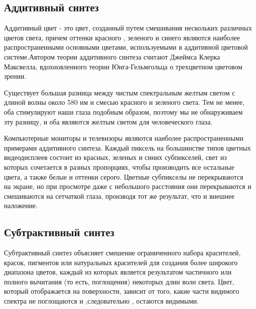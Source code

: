 \subsection{Аддитивный синтез}
Аддитивный цвет - это цвет, созданный путем смешивания нескольких различных цветов света, причем оттенки красного , зеленого и синего являются наиболее распространенными основными цветами, используемыми в аддитивной цветовой системе.Автором теории аддитивного синтеза считают Джеймса Клерка Максвелла, вдохновленного теории Юнга-Гельмгольца о трехцветном цветовом зрении.

\begin{figure}[ht!]
\end{figure}

Существует большая разница между чистым спектральным желтым светом с длиной волны около 580 нм и смесью красного и зеленого света. Тем не менее, оба стимулируют наши глаза подобным образом, поэтому мы не обнаруживаем эту разницу, и оба являются желтым светом для человеческого глаза. 


Компьютерные мониторы и телевизоры являются наиболее распространенными примерами аддитивного синтеза. Каждый пиксель на большинстве типов цветных видеодисплеев состоит из красных, зеленых и синих субпикселей, свет из которых сочетается в разных пропорциях, чтобы производить все остальные цвета, а также белые и оттенки серого. Цветные субпикселы не перекрываются на экране, но при просмотре даже с небольшого  расстояния они перекрываются и смешиваются на сетчаткой глаза, производя тот же результат, что и внешнее наложение.


\subsection{Субтрактивный синтез}
Субтрактивный синтез объясняет смешение ограниченного набора красителей, красок, пигментов или натуральных красителей для создания более широкого диапазона цветов, каждый из которых является результатом частичного или полного вычитания (то есть, поглощения) некоторых длин волн света. Цвет, который отображается на поверхности, зависит от того, какие части видимого спектра не поглощаются и ,следовательно , остаются видимыми.

